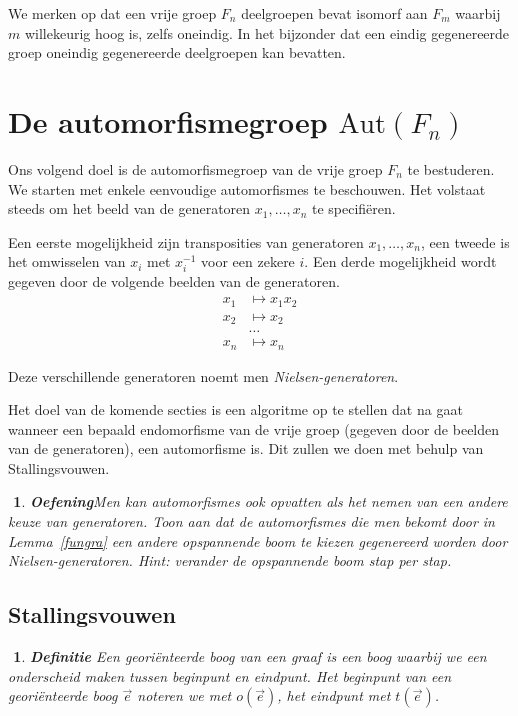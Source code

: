 \documentclass[12pt]{book}
\newtheorem{dfh}[stelh]{$\!\!$}
\newenvironment{df}{\begin{dfh} \em {\bf Definitie }}{\end{dfh}}
\newtheorem{eoef}{$\!\!$}[chapter]
\newenvironment{oef}{\begin{eoef} {\bf Oefening}}{\end{eoef}}
\begin{document}
We merken op dat een vrije groep $F_n$ deelgroepen bevat isomorf aan $F_m$ waarbij $m$ willekeurig hoog is, zelfs oneindig. In het bijzonder dat een eindig gegenereerde groep oneindig gegenereerde deelgroepen kan bevatten.


\section{De automorfismegroep $\mathrm{Aut}(F_n)$}

Ons volgend doel is de automorfismegroep van de vrije groep $F_n$ te bestuderen. We starten met enkele eenvoudige automorfismes te beschouwen. Het volstaat steeds om het beeld van de generatoren $x_1, \dots, x_n$ te specifi\"eren. 
 
Een eerste mogelijkheid zijn transposities van generatoren $x_1, \dots, x_n$, een tweede is het omwisselen van $x_i$ met $x_i^{-1}$ voor een zekere $i$. Een derde mogelijkheid wordt gegeven door de volgende beelden van de generatoren.
\begin{align*}
x_1 & \mapsto x_1 x_2 \\
x_2 & \mapsto x_2 \\
&\dots  \\
x_n &\mapsto x_n
\end{align*}

Deze verschillende generatoren noemt men \emph{Nielsen-generatoren}.

Het doel van de komende secties is een algoritme op te stellen dat na gaat wanneer een bepaald endomorfisme van de vrije groep (gegeven door de beelden van de generatoren), een automorfisme is. Dit zullen we doen met behulp van Stallingsvouwen.

\begin{oef}\label{Niel}
Men kan automorfismes ook opvatten als het nemen van een andere keuze van generatoren. Toon aan dat de automorfismes die men bekomt door in Lemma~\ref{fungra} een andere opspannende boom te kiezen gegenereerd worden door Nielsen-generatoren. Hint: verander de opspannende boom stap per stap.
\end{oef}



\subsection{Stallingsvouwen}

\begin{df} 
Een \emph{geori\"enteerde boog} van een graaf is een boog waarbij we een onderscheid maken tussen beginpunt en eindpunt. Het beginpunt van een geori\"enteerde boog $\vec{e}$ noteren we met $o(\vec{e})$, het eindpunt met $t(\vec{e})$.
\end{df}
\end{document}
